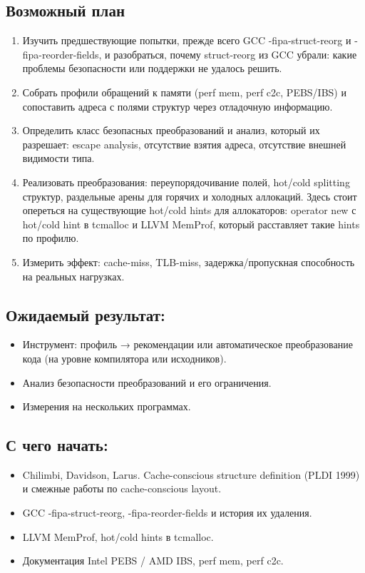 \documentclass[a4paper,12pt]{article}
\begin{document}
\subsection{Возможный план}

\begin{enumerate}
    \item Изучить предшествующие попытки, прежде всего GCC -fipa-struct-reorg и -fipa-reorder-fields, и разобраться, почему struct-reorg из GCC убрали: какие проблемы безопасности или поддержки не удалось решить.
    \item Собрать профили обращений к памяти (perf mem, perf c2c, PEBS/IBS) и сопоставить адреса с полями структур через отладочную информацию.
    \item Определить класс безопасных преобразований и анализ, который их
        разрешает: escape analysis, отсутствие взятия адреса, отсутствие внешней
        видимости типа.
    \item Реализовать преобразования: переупорядочивание полей, hot/cold splitting структур, раздельные арены для горячих и холодных аллокаций. Здесь стоит опереться на существующие hot/cold hints для аллокаторов: operator new с hot/cold hint в tcmalloc и LLVM MemProf, который расставляет такие hints по профилю.
    \item Измерить эффект: cache-miss, TLB-miss, задержка/пропускная способность на реальных нагрузках.
\end{enumerate}


\subsection{Ожидаемый результат:}

\begin{itemize}
    \item Инструмент: профиль → рекомендации или автоматическое преобразование кода (на уровне компилятора или исходников).
    \item Анализ безопасности преобразований и его ограничения.
    \item Измерения на нескольких программах.
\end{itemize}


\subsection{С чего начать:}
\begin{itemize}
    \item Chilimbi, Davidson, Larus. Cache-conscious structure definition (PLDI 1999) и смежные работы по cache-conscious layout.
    \item GCC -fipa-struct-reorg, -fipa-reorder-fields и история их удаления.
    \item LLVM MemProf, hot/cold hints в tcmalloc.
    \item Документация Intel PEBS / AMD IBS, perf mem, perf c2c.
\end{itemize}
\end{document}
